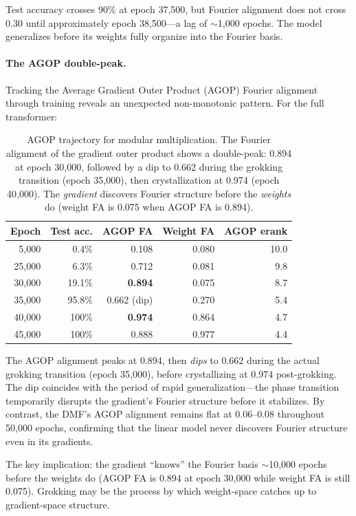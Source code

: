 \documentclass{article}
\begin{document}
Test accuracy crosses 90\% at epoch 37{,}500, but Fourier alignment does not
cross 0.30 until approximately epoch 38{,}500---a lag of $\sim$1{,}000
epochs. The model generalizes before its weights fully organize into the
Fourier basis.

\paragraph{The AGOP double-peak.}
Tracking the Average Gradient Outer Product (AGOP) Fourier alignment through
training reveals an unexpected non-monotonic pattern. For the full transformer:

\begin{table}[t]
\centering
\small
\begin{tabular}{rrrrr}
\toprule
Epoch & Test acc. & AGOP FA & Weight FA & AGOP erank \\
\midrule
5{,}000   & 0.4\%   & 0.108 & 0.080 & 10.0 \\
25{,}000  & 6.3\%   & 0.712 & 0.081 & 9.8 \\
30{,}000  & 19.1\%  & \textbf{0.894} & 0.075 & 8.7 \\
35{,}000  & 95.8\%  & 0.662 (dip) & 0.270 & 5.4 \\
40{,}000  & 100\%   & \textbf{0.974} & 0.864 & 4.7 \\
45{,}000  & 100\%   & 0.888 & 0.977 & 4.4 \\
\bottomrule
\end{tabular}
\caption{AGOP trajectory for modular multiplication. The Fourier alignment of
the gradient outer product shows a double-peak: 0.894 at epoch 30{,}000,
followed by a dip to 0.662 during the grokking transition (epoch 35{,}000),
then crystallization at 0.974 (epoch 40{,}000). The \emph{gradient}
discovers Fourier structure before the \emph{weights} do (weight FA is
0.075 when AGOP FA is 0.894).}
\label{tab:agop}
\end{table}

The AGOP alignment peaks at 0.894, then \emph{dips} to 0.662 during the
actual grokking transition (epoch 35{,}000), before crystallizing at 0.974
post-grokking. The dip coincides with the period of rapid generalization---the
phase transition temporarily disrupts the gradient's Fourier structure before
it stabilizes. By contrast, the DMF's AGOP alignment remains flat at
0.06--0.08 throughout 50{,}000 epochs, confirming that the linear model never
discovers Fourier structure even in its gradients.

The key implication: the gradient ``knows'' the Fourier basis $\sim$10{,}000
epochs before the weights do (AGOP FA is 0.894 at epoch 30{,}000 while weight
FA is still 0.075). Grokking may be the process by which weight-space catches
up to gradient-space structure.
\end{document}
